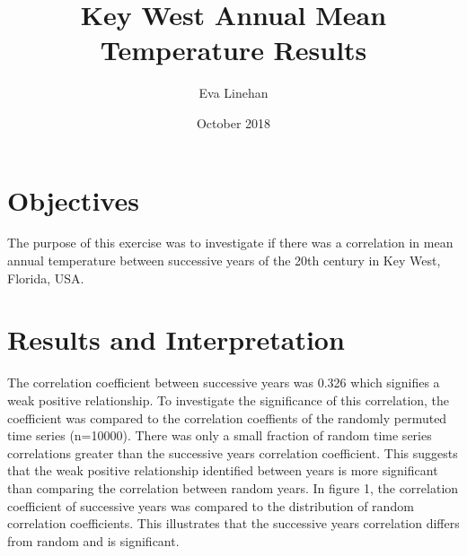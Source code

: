 \documentclass[12pt]{article}
\title{Key West Annual Mean Temperature Results}
\author{Eva Linehan}
\date{October 2018}
\begin{document}
  \maketitle
  
  \section{Objectives}
  The purpose of this exercise was to investigate if there was a correlation in mean annual temperature between successive years of the 20th century in Key West, Florida, USA.  
  
  \section{Results and Interpretation}
  The correlation coefficient between successive years was 0.326 which signifies a weak positive relationship. To investigate the significance of this correlation, the coefficient was compared to the correlation coeffients of the randomly permuted time series (n=10000). There was only a small fraction of random time series correlations greater than the successive years correlation coefficient. This suggests that the weak positive relationship identified between years is more significant than comparing the correlation between random years.
  In figure 1, the correlation coefficient of successive years was compared to the distribution of random correlation coefficients. This illustrates that the successive years correlation differs from random and is significant.
  
\end{document}

